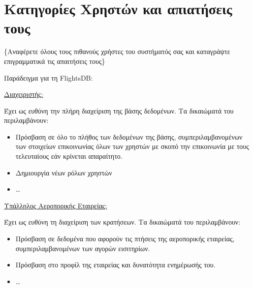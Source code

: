 
\section{Κατηγορίες Χρηστών και απιατήσεις τους}

\{Αναφέρετε όλους τους πιθανούς χρήστες του συστήματός σας και
καταγράψτε επιγραμματικά τις απαιτήσεις τους\}

Παράδειγμα για τη FlightsDB:

\underline{Διαχειριστής:}

Έχει ως ευθύνη την πλήρη διαχείριση της βάσης δεδομένων. Τα δικαιώματά
του περιλαμβάνουν:
\begin{itemize}[noitemsep]
\item Πρόσβαση σε όλο το πλήθος των δεδομένων της βάσης,
  συμπεριλαμβανομένων των στοιχείων επικοινωνίας όλων των χρηστών με
  σκοπό την επικοινωνία με τους τελευταίους εάν κρίνεται απαραίτητο.
\item Δημιουργία νέων ρόλων χρηστών
\item \ldots
\end{itemize}

\underline{Υπάλληλος Αεροπορικής Εταιρείας:}

Έχει ως ευθύνη τη διαχείριση των κρατήσεων. Τα δικαιώματά του
περιλαμβάνουν:
\begin{itemize}[noitemsep]
\item Πρόσβαση σε δεδομένα που αφορούν τις πτήσεις της αεροπορικής
  εταιρείας, συμπεριλαμβανομένων των αγορών εισιτηρίων.
\item Πρόσβαση στο προφίλ της εταιρείας και δυνατότητα ενημέρωσής
  του.
\item \ldots
\end{itemize}

